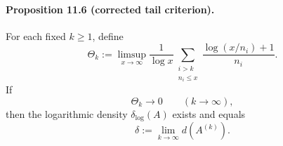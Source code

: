 \paragraph{Proposition 11.6 (corrected tail criterion).}
For each fixed $k\ge 1$, define
\begin{equation}
\Theta_k:=
\limsup_{x\to\infty}
\frac1{\log x}
\sum_{\substack{i>k\\ n_i\le x}}
\frac{\log(x/n_i)+1}{n_i}.
\tag{11.10}
\end{equation}
If
\begin{equation}
\Theta_k\longrightarrow 0
\qquad (k\to\infty),
\tag{11.11}
\end{equation}
then the logarithmic density $\delta_{\log}(A)$ exists and equals
\begin{equation}
\delta:=\lim_{k\to\infty} d(A^{(k)}).
\tag{11.12}
\end{equation}

